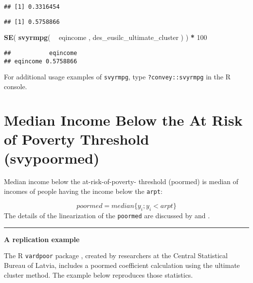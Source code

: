 \documentclass[]{book}
\newenvironment{Shaded}{\begin{snugshade}}{\end{snugshade}}
\newcommand{\CommentTok}[1]{\textcolor[rgb]{0.56,0.35,0.01}{\textit{#1}}}
\newcommand{\DecValTok}[1]{\textcolor[rgb]{0.00,0.00,0.81}{#1}}
\newcommand{\KeywordTok}[1]{\textcolor[rgb]{0.13,0.29,0.53}{\textbf{#1}}}
\newcommand{\NormalTok}[1]{#1}
\newcommand{\OperatorTok}[1]{\textcolor[rgb]{0.81,0.36,0.00}{\textbf{#1}}}
\newcommand{\StringTok}[1]{\textcolor[rgb]{0.31,0.60,0.02}{#1}}
\begin{document}
\begin{verbatim}
## [1] 0.3316454
\end{verbatim}

\begin{Shaded}
\end{Shaded}

\begin{verbatim}
## [1] 0.5758866
\end{verbatim}

\begin{Shaded}
\begin{Highlighting}[]
\KeywordTok{SE}\NormalTok{( }\KeywordTok{svyrmpg}\NormalTok{( }\OperatorTok{~}\StringTok{ }\NormalTok{eqincome , des_eusilc_ultimate_cluster ) ) }\OperatorTok{*}\StringTok{ }\DecValTok{100}
\end{Highlighting}
\end{Shaded}

\begin{verbatim}
##           eqincome
## eqincome 0.5758866
\end{verbatim}

For additional usage examples of \texttt{svyrmpg}, type \texttt{?convey::svyrmpg} in the R console.

\hypertarget{median-income-below-the-at-risk-of-poverty-threshold-svypoormed}{%
\section{Median Income Below the At Risk of Poverty Threshold (svypoormed)}\label{median-income-below-the-at-risk-of-poverty-threshold-svypoormed}}

Median income below the at-risk-of-poverty- threshold (poormed) is median of incomes of people having the income below the \texttt{arpt}:

\[
poormed = median\{y_i; y_i< arpt\}
\]
The details of the linearization of the \texttt{poormed} are discussed by \citet{deville1999} and \citet{osier2009}.

\begin{center}\rule{0.5\linewidth}{0.5pt}\end{center}

\textbf{A replication example}

The R \texttt{vardpoor} package \citep{vardpoor}, created by researchers at the Central Statistical Bureau of Latvia, includes a poormed coefficient calculation using the ultimate cluster method. The example below reproduces those statistics.
\end{document}
